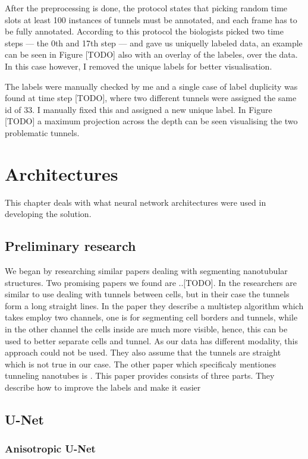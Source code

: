 \documentclass[
  digital,     %
  oneside,     %
  nosansbold,  %
  nocolorbold, %
  lof,         %
  lot,         %
]{fithesis4}
\begin{document}
After the preprocessing is done, the protocol states that picking random time
slots at least 100 instances of tunnels must be annotated, and each frame has to
be fully annotated. According to this protocol the biologists picked two time
steps --- the 0th and 17th step --- and gave us uniquelly labeled data, an
example can be seen in Figure [TODO] also with an overlay of the labeles, over
the data. In this case however, I removed the unique labels for better
visualisation.

The labels were manually checked by me and a single case of label duplicity was
found at time step [TODO], where two different tunnels were assigned the same id
of 33. I manually fixed this and assigned a new unique label. In Figure [TODO] a
maximum projection across the depth can be seen visualising the two problematic
tunnels.

\chapter{Architectures}
This chapter deals with what neural network architectures were used in
developing the solution.

\section{Preliminary research}
We began by researching similar papers dealing with segmenting nanotubular
structures. Two promising papers we found are ..[TODO]. In
\parencite{Hodneland2006Automated} the researchers are similar to use dealing
with tunnels between cells, but in their case the tunnels form a long straight
lines. In the paper they describe a multistep algorithm which takes employ two
channels, one is for segmenting cell borders and tunnels, while in the other
channel the cells inside are much more visible, hence, this can be used to
better separate cells and tunnel.
As our data has different modality, this approach could not be used. They also
assume that the tunnels are straight which is not true in our case.
The other paper which specificaly mentiones tunneling nanotubes is
\parencite{Ceran2022TNTdetect}. This paper provides consists of three parts.
They describe how to improve the labels and make it easier 

\section{U-Net}

\subsection{Anisotropic U-Net}
\end{document}
